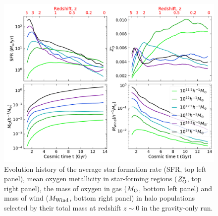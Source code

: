 \begin{figure}[htbp]
\centering
\includegraphics[width=\linewidth]{plots/dynam_relxn/hal_gal_props_evolve.pdf}
\caption{Evolution history of the average star formation rate (SFR, top left panel), mean oxygen metallicity in star-forming regions ($Z^{\star}_{\rm{O}}$, top right panel), the mass of oxygen in gas ($M_{\rm{O}}$, bottom left panel) and mass of wind ($M_{\rm{Wind}}$, bottom right panel) in halo populations selected by their total mass at redshift $z\sim 0$ in the gravity-only run.}
\label{fig:evolution-hal-gal-props}
\end{figure}

